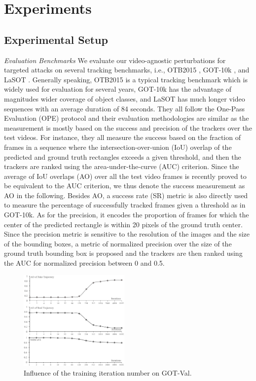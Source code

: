 \documentclass[journal]{IEEEtran}
\newcommand{\ie}{i.e.}
\begin{document}
\section{Experiments}

\subsection{Experimental Setup}

\textit{Evaluation Benchmarks} We evaluate our video-agnostic perturbations for targeted attacks on several tracking benchmarks, \ie, OTB2015 \cite{OTB}, GOT-10k \cite{GOT-10k}, and LaSOT \cite{LaSOT}. Generally speaking, OTB2015 is a typical tracking benchmark which is widely used for evaluation for several years, GOT-10k has the advantage of magnitudes wider coverage of object classes, and LaSOT has much longer video sequences with an average duration of 84 seconds. They all follow the One-Pass Evaluation (OPE) protocol and their evaluation methodologies are similar as the measurement is mostly based on the success and precision of the trackers over the test videos. For instance, they all measure the success based on the fraction of frames in a sequence where the intersection-over-union (IoU) overlap of the predicted and ground truth rectangles exceeds a given threshold, and then the trackers are ranked using the area-under-the-curve (AUC) criterion. Since the average of IoU overlaps (AO) over all the test video frames is recently proved to be equivalent to the AUC criterion, we thus denote the success measurement as AO in the following. Besides AO, a success rate (SR) metric is also directly used to measure the percentage of successfully tracked frames given a threshold as in GOT-10k. As for the precision, it encodes the proportion of frames for which the center of the predicted rectangle is within 20 pixels of the ground truth center. Since the precision metric is sensitive to the resolution of the images and the size of the bounding boxes, a metric of normalized precision over the size of the ground truth bounding box is proposed and the trackers are then ranked using the AUC for normalized precision between 0 and 0.5.

\begin{figure}[t]
  \centering
  \includegraphics[width=0.48\textwidth]{images_imperceptible/iter.png}
  \caption{Influence of the training iteration number on GOT-Val.} 
  \label{fig:iter}
\end{figure}
\end{document}
